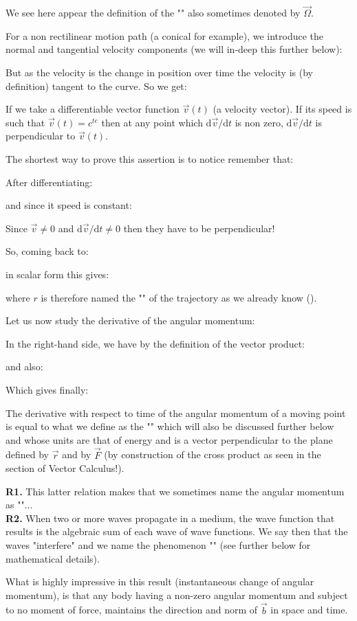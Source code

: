	We see here appear the definition of the "" also sometimes denoted by $\vec{\Omega}$.
	
	For a non rectilinear motion path (a conical for example), we introduce the normal and tangential velocity components (we will in-deep this further below):
	
	But as the velocity is the change in position over time the velocity is (by definition) tangent to the curve. So we get:
	
	
	If we take a differentiable vector function $\vec{v}(t)$ (a velocity vector). If its speed is such that $\vec{v}(t)=c^{te}$ then at any point which $\mathrm{d}\vec{v}/\mathrm{d}t$ is non zero, $\mathrm{d}\vec{v}/\mathrm{d}t$ is perpendicular to  $\vec{v}(t)$.
	
	The shortest way to prove this assertion is to notice remember that:
	
	After differentiating:
	
	and since it speed is constant:
	
	Since $\vec{v}\neq 0$ and $\mathrm{d}\vec{v}/\mathrm{d}t\neq 0$ then they have to be perpendicular!
	
	So, coming back to:
	
	in scalar form this gives:
	
	where $r$ is therefore named the "" of the trajectory as we already know ().

	Let us now study the derivative of the angular momentum:
	
	In the right-hand side, we have by the definition of the vector product:
	
	and also:
	
	Which gives finally:
	
	The derivative with respect to time of the angular momentum of a moving point is equal to what we define as the "" which will also be discussed further below and whose units are that of energy and is a vector perpendicular to the plane defined by $\vec{r}$ and by $\vec{F}$ (by construction of the cross product as seen in the section of Vector Calculus!).
	\begin{tcolorbox}[title=Remarks,colframe=black,arc=10pt]
	\textbf{R1.} This latter relation makes that we sometimes name the angular momentum as ""...\\
	
	\textbf{R2.} When two or more waves propagate in a medium, the wave function that results is the algebraic sum of each wave of wave functions. We say then that the waves "interfere" and we name the phenomenon "" (see further below for mathematical details).
	\end{tcolorbox}
	What is highly impressive in this result (instantaneous change of angular momentum), is that any body having a non-zero angular momentum and subject to no moment of force, maintains the direction and norm of $\vec{b}$ in space and time.
	
